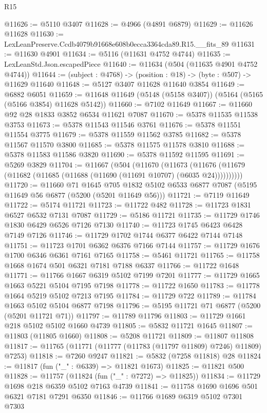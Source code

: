 \begin{lexlean}{R15}
\begin{coremodule}
{{{{{{{{{{{@11626 := @5110 @3407
@11628 := @4966 (@4891 @6879)
@11629 := @11626 @11628
@11630 := LexLeanPreserve.Ccdb4079b91668e608b0ecca3364cda89.R15.__fits_89
@11631 := @11630 @4901
@11634 := @5116 (@11631 @4752 @4744)
@11635 := LexLeanStd.Json.escapedPiece
@11640 := @11634 (@504 (@11635 @4901 @4752 @4744))
@11644 := (subject : @4768) -> (position : @18) -> (byte : @507) -> @11629 @11640
@11648 := @5127 @3407 @11628 @11640 @3854
@11649 := @6882 @6051
@11659 := @11648 @11649 (@5148 (@5158 @3407)) (@5164 (@5165 (@5166 @3854) @11628 @5142))
@11660 := @7102 @11649
@11667 := @11660 @92 @28 @1833 @3852 @6534 @11621 @7087
@11670 := @5378 @11535 @11538 @3753
@11673 := @5378 @11543 @11546 @3761
@11676 := @5378 @11551 @11554 @3775
@11679 := @5378 @11559 @11562 @3785
@11682 := @5378 @11567 @11570 @3800
@11685 := @5378 @11575 @11578 @3810
@11688 := @5378 @11583 @11586 @3820
@11690 := @5378 @11592 @11595
@11691 := @5269 @3829
@11704 := @11667
    (@504
      (@11670
        (@11673 (@11676 (@11679 (@11682 (@11685 (@11688 (@11690 (@11691 @10707) (@6035 @24))))))))))
@11720 := @11660
    @71
    @1645
    @705
    @1832
    @5102
    @6533
    @6877
    @7087
    (@5195 @11649 @56 @6877 (@5200 (@5201 @11649 @56)))
@11721 := @7119 @11649
@11722 := @5174 @11721
@11723 := @11722 @482
@11728 := @11723 @1831 @6527 @6532 @7131 @7087
@11729 := @5186 @11721
@11735 := @11729 @1746 @1830 @6429 @6526 @7126 @7130
@11740 := @11723 @1745 @6423 @6428 @7149 @7126
@11746 := @11729 @1702 @1744 @6377 @6422 @7144 @7148
@11751 := @11723 @1701 @6362 @6376 @7166 @7144
@11757 := @11729 @1676 @1700 @6346 @6361 @7161 @7165
@11758 := @5461 @11721
@11765 := @11758 @1668 @1674 @501 @6321 @7181 @7188 @6337
@11766 := @11722 @1648
@11771 := @11766 @1667 @6319 @5102 @7199 @7201
@11777 := @11729 @1665 @1663 @5221 @5104 @7195 @7198
@11778 := @11722 @1650
@11783 := @11778 @1664 @5219 @5102 @7213 @7195
@11784 := @11729 @722
@11789 := @11784 @1663 @5102 @5104 @6877 @7198
@11796 := @5195 @11721 @71 @6877 (@5200 (@5201 @11721 @71))
@11797 := @11789 @11796
@11803 := @11729 @1661 @218 @5102 @5102 @1660 @4739
@11805 := @5832 @11721 @1645
@11807 := @11803 (@11805 @1660)
@11808 := @5208 @11721
@11809 := @11807 @11808
@11817 := @11765 (@11771 (@11777 (@11783 (@11797 @11809) @7246) @11809) @7253)
@11818 := @7260 @9247
@11821 := @5832 (@7258 @11818) @28
@11824 := @11817 (fun ("_" : @6339) => @11821 @1673)
@11825 := @11821 @500
@11828 := @11757 (@11824 (fun ("_" : @7272) => @11825))
@11834 := @11729 @1698 @218 @6359 @5102 @7163 @4739
@11841 := @11758 @1690 @1696 @501 @6321 @7181 @7291 @6350
@11846 := @11766 @1689 @6319 @5102 @7301 @7303
}}}}}}}}}}}
\end{coremodule}
\end{lexlean}
